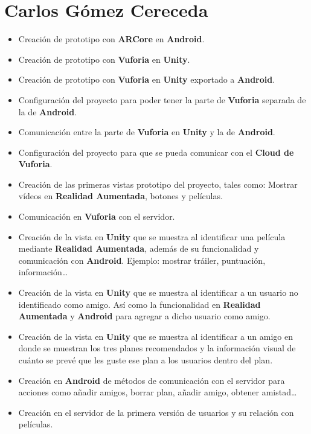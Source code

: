 \section{Carlos Gómez Cereceda}
\label{makereference7.3}
\begin{itemize}  
    \item Creación de prototipo con \textbf{ARCore} en \textbf{Android}.
    \item Creación de prototipo con \textbf{Vuforia} en \textbf{Unity}.
    \item Creación de prototipo con \textbf{Vuforia} en \textbf{Unity} exportado a \textbf{Android}.
    \item Configuración del proyecto para poder tener la parte de \textbf{Vuforia} separada de la de \textbf{Android}.
    \item Comunicación entre la parte de \textbf{Vuforia} en \textbf{Unity} y la de \textbf{Android}.
    \item Configuración del proyecto para que se pueda comunicar con el \textbf{Cloud de Vuforia}.
    \item Creación de las primeras vistas prototipo del proyecto, tales como: Mostrar vídeos en \textbf{Realidad Aumentada}, botones y películas.
    \item Comunicación en \textbf{Vuforia} con el servidor.
    \item Creación de la vista en \textbf{Unity} que se muestra al identificar una película mediante \textbf{Realidad Aumentada}, además de su funcionalidad y comunicación con \textbf{Android}. Ejemplo: mostrar tráiler, puntuación, información…
    \item Creación de la vista en \textbf{Unity} que se muestra al identificar a un usuario no identificado como amigo. Así como la funcionalidad en \textbf{Realidad Aumentada} y \textbf{Android} para agregar a dicho usuario como amigo.
    \item Creación de la vista en \textbf{Unity} que se muestra al identificar a un amigo en donde se muestran los tres planes recomendados y la información visual de cuánto se prevé que les guste ese plan a los usuarios dentro del plan.
    \item Creación en \textbf{Android} de métodos de comunicación con el servidor para acciones como añadir amigos, borrar plan, añadir amigo, obtener amistad…
    \item Creación en el servidor de la primera versión de usuarios y su relación con películas.
\end{itemize}

